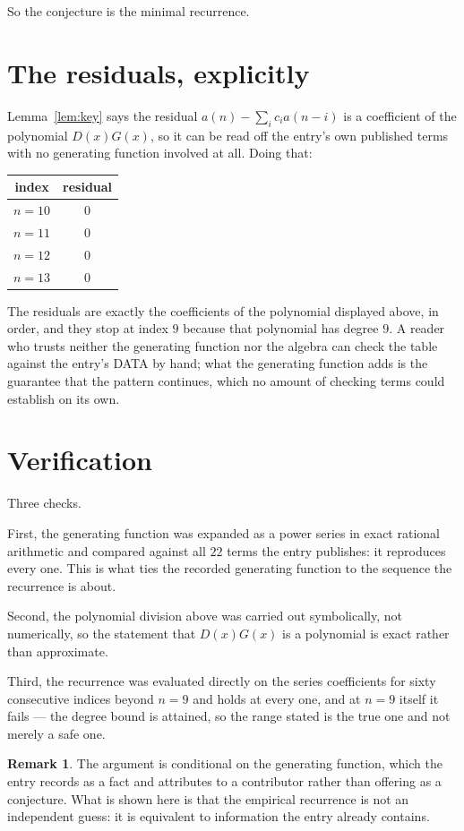 \documentclass[11pt,a4paper]{article}
\theoremstyle{plain}
\theoremstyle{definition}
\newtheorem{remark}[theorem]{Remark}
\begin{document}
So the conjecture is the minimal recurrence.

\section{The residuals, explicitly}

Lemma~\ref{lem:key} says the residual $a(n)-\sum_ic_ia(n-i)$ is a coefficient of the
polynomial $D(x)G(x)$, so it can be read off the entry's own published terms with no
generating function involved at all. Doing that:
\begin{center}
\begin{tabular}{cc}
index & residual \\ \hline
$n=10$ & $0$ \\
$n=11$ & $0$ \\
$n=12$ & $0$ \\
$n=13$ & $0$
\end{tabular}
\end{center}
The residuals are exactly the coefficients of the polynomial displayed above, in order, and
they stop at index $9$ because that polynomial has degree $9$. A reader who trusts
neither the generating function nor the algebra can check the table against the entry's DATA
by hand; what the generating function adds is the guarantee that the pattern continues, which
no amount of checking terms could establish on its own.

\section{Verification}

Three checks.

First, the generating function was expanded as a power series in exact rational arithmetic and
compared against all $22$ terms the entry publishes: it reproduces every one. This is
what ties the recorded generating function to the sequence the recurrence is about.

Second, the polynomial division above was carried out symbolically, not numerically, so the
statement that $D(x)G(x)$ is a polynomial is exact rather than approximate.

Third, the recurrence was evaluated directly on the series coefficients for sixty consecutive
indices beyond $n=9$ and holds at every one, and at $n=9$ itself it fails --- the
degree bound is attained, so the range stated is the true one and not merely a safe one.

\begin{remark}
The argument is conditional on the generating function, which the entry records as a fact and
attributes to a contributor rather than offering as a conjecture. What is shown here is that
the empirical recurrence is not an independent guess: it is equivalent to information the
entry already contains.
\end{remark}
\end{document}
